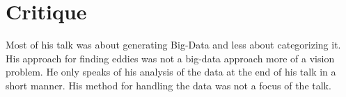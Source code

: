 \documentclass{article}
\begin{document}
\section*{Critique}
Most of his talk was about generating Big-Data and less about categorizing it. His approach for finding eddies was not a big-data approach more of a vision problem. He only speaks of his analysis of the data at the end of his talk in a short manner. His method for handling the data was not a focus of the talk.
\cite{goossens93}
\end{document}
